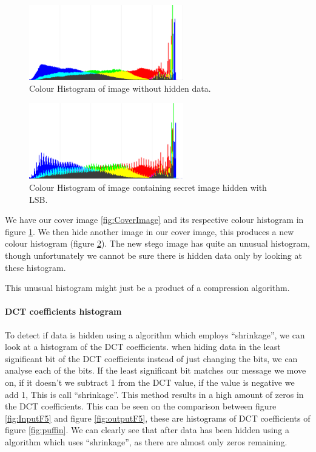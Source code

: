 \begin{figure}
	\centering
	\includegraphics[width=0.6\textwidth]{figures/HistoLSBCat.png}
	\caption{Colour Histogram of image without hidden data.}
	\label{fig:HistoWithoutLSB}
\end{figure}

\begin{figure}
	\centering
	\includegraphics[width=0.6\textwidth]{figures/HistoLSBCatEncrypted.png}
	\caption{Colour Histogram of image containing secret image hidden with LSB.}
	\label{fig:HistoWithLSB}
\end{figure}

We have our cover image \ref{fig:CoverImage} and its respective colour histogram in figure \ref{fig:HistoWithoutLSB}.
We then hide another image in our cover image, this produces a new colour histogram (figure \ref{fig:HistoWithLSB}).
The new stego image has quite an unusual histogram, though unfortunately we cannot be sure there is hidden data only by looking at these histogram.

This unusual histogram might just be a product of a compression algorithm.

\paragraph*{DCT coefficients histogram}
To detect if data is hidden using a algorithm which employs ``shrinkage'', we can look at a histogram of the DCT coefficients.
when hiding data in the least significant bit of the DCT coefficients instead of just changing the bits, we can analyse each of the bits.
If the least significant bit matches our message we move on, if it doesn't we subtract 1 from the DCT value, if the value is negative we add 1, This is call ``shrinkage''.
This method results in a high amount of zeros in the DCT coefficients.
This can be seen on the comparison between figure \ref{fig:InputF5} and figure \ref{fig:outputF5}, these are histograms of DCT coefficients of figure \ref{fig:puffin}.
We can clearly see that after data has been hidden using a algorithm which uses ``shrinkage'', as there are almost only zeros remaining.



